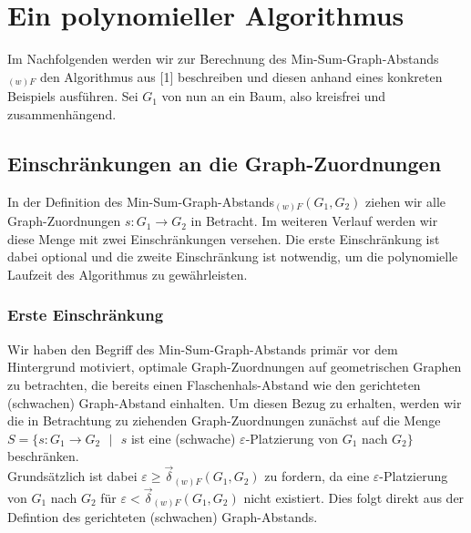 \documentclass[a4paper, 12pt, twoside]{article}
\theoremstyle{Format1} %
\begin{document}
\section{Ein polynomieller Algorithmus}

Im Nachfolgenden werden wir zur Berechnung des Min-Sum-Graph-Abstands$_{(w)F}$ den Algorithmus aus [1] beschreiben und diesen anhand eines konkreten Beispiels ausführen.
Sei $G_1$ von nun an ein Baum, also kreisfrei und zusammenhängend.

\subsection{Einschränkungen an die Graph-Zuordnungen} \label{Einschränkungen}
In der Definition des Min-Sum-Graph-Abstands$_{(w)F}(G_1, G_2)$ ziehen wir alle Graph-Zuordnungen $s: G_1 \to G_2$ in Betracht.
Im weiteren Verlauf werden wir diese Menge mit zwei Einschränkungen versehen.
Die erste Einschränkung ist dabei optional und die zweite Einschränkung ist notwendig, um die polynomielle Laufzeit des Algorithmus zu gewährleisten.

\subsubsection{Erste Einschränkung}
Wir haben den Begriff des Min-Sum-Graph-Abstands primär vor dem Hintergrund motiviert, optimale Graph-Zuordnungen auf geometrischen Graphen zu betrachten,
die bereits einen Flaschenhals-Abstand wie den gerichteten (schwachen) Graph-Abstand einhalten.
Um diesen Bezug zu erhalten, werden wir die in Betrachtung zu ziehenden Graph-Zuordnungen zunächst auf die Menge
$S = \{s: G_1 \to G_2 \text{ $|$ } s$ ist eine (schwache) $\varepsilon$-Platzierung von $G_1$ nach $G_2\}$ beschränken.
\\
Grundsätzlich ist dabei $\varepsilon \geq \vec{\delta}_{(w)F}(G_1, G_2)$ zu fordern, da eine $\varepsilon$-Platzierung von $G_1$ nach $G_2$ für $\varepsilon < \vec{\delta}_{(w)F}(G_1,G_2)$
nicht existiert. Dies folgt direkt aus der Defintion des gerichteten (schwachen) Graph-Abstands.
\\
\end{document}
